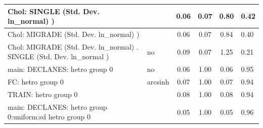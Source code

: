 \begin{table}
\begin{center}
\begin{tabular}{|l|l|c|c|c|l|}
			 Chol: SINGLE (Std. Dev. ln_normal) ) &  & 0.06 & 0.07 & 0.80 & 0.42 \\
			\hline
			 Chol: MIGRADE (Std. Dev. ln_normal) ) &  & 0.06 & 0.07 & 0.84 & 0.40 \\
			\hline
			 Chol: MIGRADE (Std. Dev. ln_normal) . SINGLE (Std. Dev.   ln_normal ) & no & 0.09 & 0.07 & 1.25 & 0.21 \\
			\hline
			main: DECLANES: hetro group 0 & no & 0.06 & 1.00 & 0.06 & 0.95 \\
			\hline
			FC: hetro group 0 & arcsinh & 0.07 & 1.00 & 0.07 & 0.94 \\
			\hline
			TRAIN: hetro group 0 &  & 0.08 & 1.00 & 0.08 & 0.94 \\
			\hline
			main: DECLANES: hetro group 0:uniform:sd  hetro group 0 &  & 0.05 & 1.00 & 0.05 & 0.96 \\
			\hline
		\end{tabular}
	\end{center}
\end{table}